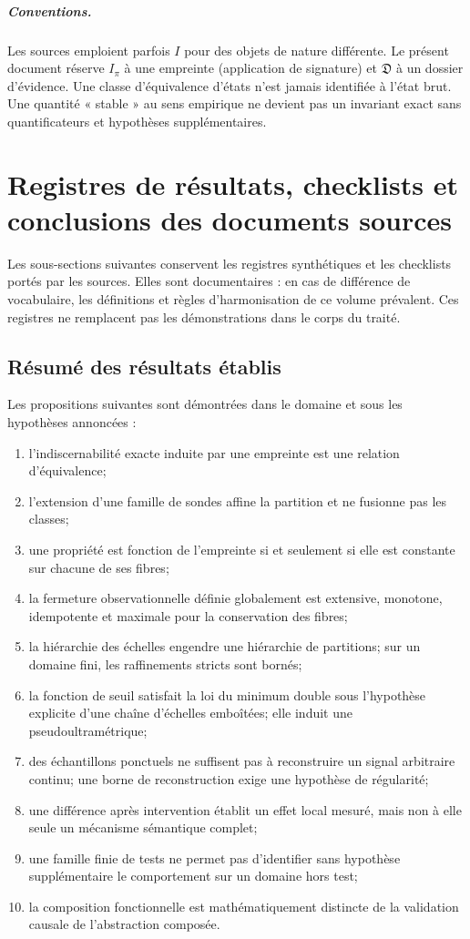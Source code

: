\documentclass[11pt,oneside]{book}
\theoremstyle{definition}
\theoremstyle{remark}
\newcommand{\1}{\mathbf 1}
\begin{document}
\paragraph{Conventions.} Les sources emploient parfois $I$ pour des objets de nature différente. Le présent document réserve $I_\pi$ à une empreinte (application de signature) et $\mathfrak D$ à un dossier d'évidence. Une classe d'équivalence d'états n'est jamais identifiée à l'état brut. Une quantité « stable » au sens empirique ne devient pas un invariant exact sans quantificateurs et hypothèses supplémentaires.

\chapter{Registres de résultats, checklists et conclusions des documents sources}
Les sous-sections suivantes conservent les registres synthétiques et les checklists portés par les sources. Elles sont documentaires : en cas de différence de vocabulaire, les définitions et règles d'harmonisation de ce volume prévalent. Ces registres ne remplacent pas les démonstrations dans le corps du traité.

\section*{Résumé des résultats établis}
Les propositions suivantes sont démontrées dans le domaine et sous les hypothèses annoncées :
\begin{enumerate}
\item l'indiscernabilité exacte induite par une empreinte est une relation d'équivalence;
\item l'extension d'une famille de sondes affine la partition et ne fusionne pas les classes;
\item une propriété est fonction de l'empreinte si et seulement si elle est constante sur chacune de ses fibres;
\item la fermeture observationnelle définie globalement est extensive, monotone, idempotente et maximale pour la conservation des fibres;
\item la hiérarchie des échelles engendre une hiérarchie de partitions; sur un domaine fini, les raffinements stricts sont bornés;
\item la fonction de seuil satisfait la loi du minimum double sous l'hypothèse explicite d'une chaîne d'échelles emboîtées; elle induit une pseudoultramétrique;
\item des échantillons ponctuels ne suffisent pas à reconstruire un signal arbitraire continu; une borne de reconstruction exige une hypothèse de régularité;
\item une différence après intervention établit un effet local mesuré, mais non à elle seule un mécanisme sémantique complet;
\item une famille finie de tests ne permet pas d'identifier sans hypothèse supplémentaire le comportement sur un domaine hors test;
\item la composition fonctionnelle est mathématiquement distincte de la validation causale de l'abstraction composée.
\end{enumerate}
\end{document}

